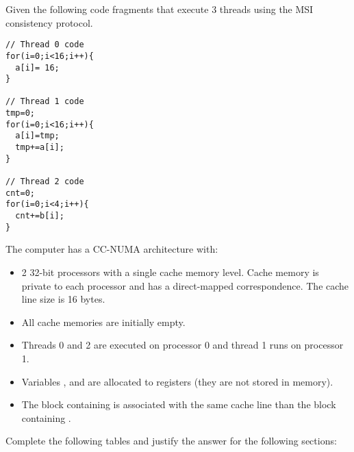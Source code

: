 \begin{acexercise}
\label{ex:m5-02:dir-01}
\end{acexercise}

Given the following code fragments that execute 3 threads using the
MSI consistency protocol.


\begin{lstlisting}
// Thread 0 code
for(i=0;i<16;i++){
  a[i]= 16;
}
 
// Thread 1 code
tmp=0;
for(i=0;i<16;i++){
  a[i]=tmp;
  tmp+=a[i];
}
 
// Thread 2 code
cnt=0;
for(i=0;i<4;i++){
  cnt+=b[i];
}
\end{lstlisting}

The computer has a CC-NUMA architecture with:

\begin{itemize}
  \item 2 32-bit processors with a single cache memory level. 
        Cache memory is private to each processor and has a direct-mapped correspondence. The cache line size is 16 bytes.

   \item All cache memories are initially empty.

   \item Threads 0 and 2 are executed on processor 0 and thread 1 runs on processor 1.

   \item Variables ,  and  
         are allocated to registers (they are not stored in memory).     

   \item The block containing  is associated with the same cache line 
         than the block containing .
\end{itemize}

Complete the following tables and justify the answer for the following sections:


